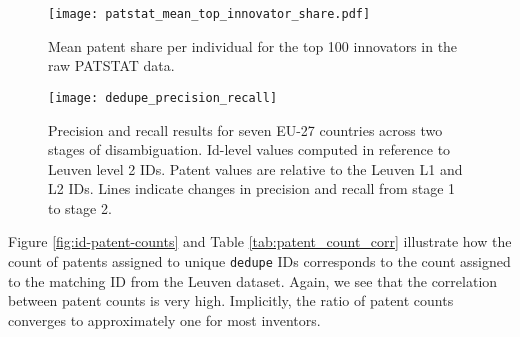 \documentclass[11pt]{article}
\begin{document}


\begin{figure}[ht]
  \centering
  \texttt{[image: patstat\_mean\_top\_innovator\_share.pdf]}
  \caption{Mean patent share per individual for the top 100 innovators in the raw PATSTAT data.}
  \label{fig:patent-share}
\end{figure}

\begin{figure}[ht]
  \centering
  \texttt{[image: dedupe\_precision\_recall]}
  \caption{Precision and recall results for seven EU-27 countries
    across two stages of disambiguation. Id-level values computed in
    reference to Leuven level 2
    IDs. Patent values are relative to the Leuven L1 and L2 IDs. Lines
  indicate changes in precision and recall from stage 1 to stage 2.}
  \label{fig:dedupe-pr}
\end{figure}


\begin{landscape}

\end{landscape}

Figure \ref{fig:id-patent-counts} and Table \ref{tab:patent_count_corr}
illustrate how the count of patents assigned to unique \texttt{dedupe}
IDs corresponds to the count assigned to the matching ID from the
Leuven dataset. Again, we see that the correlation between patent
counts is very high. Implicitly, the ratio of patent counts converges
to approximately one for most inventors. 
\end{document}
